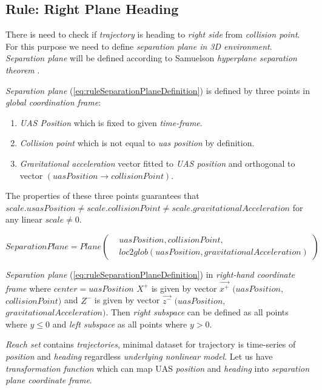 \subsection{Rule: Right Plane Heading}\label{sec:ruleRightPlaneHeading}
    \noindent There is need to check if \emph{trajectory} is heading to \emph{right side} from \emph{collision point}. For this purpose we need to define \emph{separation plane in 3D environment}. \emph{Separation plane} will be defined according to Samuelson \emph{hyperplane separation theorem} \cite{samelson1958partition}.
    
    \emph{Separation plane} (\ref{eq:ruleSeparationPlaneDefinition}) is defined by three points in \emph{global coordination frame}:
    \begin{enumerate}
        \item \emph{UAS Position} which is fixed to given \emph{time-frame}.
        \item \emph{Collision point} which is not equal to \emph{uas position} by definition.
        \item \emph{Gravitational acceleration} vector fitted to \emph{UAS position} and orthogonal to vector $(uasPosition\to collisionPoint)$.
    \end{enumerate}
    The properties of these three points guarantees that 
    $scale.usasPosition\neq scale.collisionPoint \neq scale.gravitationalAcceleration$ for any linear $scale\neq0$.
    
    \begin{equation}\label{eq:ruleSeparationPlaneDefinition}
        SeparationPlane=Plane\left(\begin{aligned}&uasPosition,collisionPoint,\\&loc2glob(uasPosition,gravitationalAcceleration)\end{aligned}\right)
    \end{equation}
    
    \noindent \emph{Separation plane} (\ref{eq:ruleSeparationPlaneDefinition}) in \emph{right-hand coordinate frame} where $center=uasPosition$ $X^+$ is given by vector $\vec{x^+}$ $(uasPosition,$ $collisionPoint)$  and $Z^-$ is given by vector $\vec{z^-}$  $(uasPosition,$ $gravitationalAcceleration)$. Then \emph{right subspace} can be defined as all points where $y\le0$ and \emph{left subspace} as all points where $y>0$.
    
    \emph{Reach set} contains \emph{trajectories}, minimal dataset for trajectory is time-series of \emph{position} and \emph{heading} regardless \emph{underlying nonlinear model}. Let us have \emph{transformation function} which can map UAS \emph{position} and \emph{heading} into \emph{separation plane coordinate frame}. 
    
